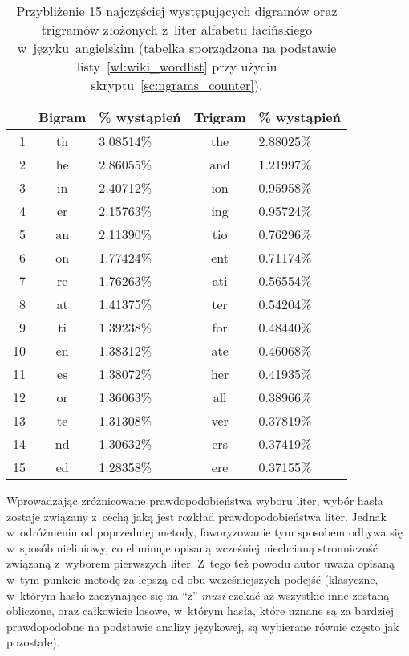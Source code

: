 \begin{myenumerate}
    \begin{table}[htb]
        \caption{Przybliżenie 15 najczęściej występujących digramów oraz
        trigramów złożonych z~liter alfabetu łacińskiego w~języku~angielskim
        (tabelka sporządzona na podstawie listy~\ref{wl:wiki_wordlist} przy
        użyciu skryptu~\ref{sc:ngrams_counter}).}
        \begin{tabular}{|r||c|l||c|l|}
            \hline
            & Bigram & \small \% wystąpień &
            Trigram & \small \% wystąpień \\
            \hline
            1  & th & 3.08514\% & the & 2.88025\% \\
            2  & he & 2.86055\% & and & 1.21997\% \\
            3  & in & 2.40712\% & ion & 0.95958\% \\
            4  & er & 2.15763\% & ing & 0.95724\% \\
            5  & an & 2.11390\% & tio & 0.76296\% \\
            6  & on & 1.77424\% & ent & 0.71174\% \\
            7  & re & 1.76263\% & ati & 0.56554\% \\
            8  & at & 1.41375\% & ter & 0.54204\% \\
            9  & ti & 1.39238\% & for & 0.48440\% \\
            10 & en & 1.38312\% & ate & 0.46068\% \\
            11 & es & 1.38072\% & her & 0.41935\% \\
            12 & or & 1.36063\% & all & 0.38966\% \\
            13 & te & 1.31308\% & ver & 0.37819\% \\
            14 & nd & 1.30632\% & ers & 0.37419\% \\
            15 & ed & 1.28358\% & ere & 0.37155\% \\
            \hline
        \end{tabular}
    \end{table}

    Wprowadzając zróżnicowane prawdopodobieństwa wyboru liter, wybór hasła
    zostaje związany z~cechą jaką jest rozkład prawdopodobieństwa liter. Jednak
    w~odróżnieniu od poprzedniej metody, faworyzowanie tym sposobem odbywa się
    w~sposób nieliniowy, co eliminuje opisaną wcześniej niechcianą stronniczość
    związaną z~wyborem pierwszych liter. Z~tego też powodu autor uważa opisaną
    w~tym punkcie metodę za lepszą od obu wcześniejszych podejść (klasyczne,
    w~którym hasło zaczynające się na ``z'' \emph{musi} czekać aż wszystkie
    inne zostaną obliczone, oraz całkowicie losowe, w~którym hasła, które
    uznane są za bardziej prawdopodobne na podstawie analizy językowej, są
    wybierane równie często jak pozostałe).

\end{myenumerate}

